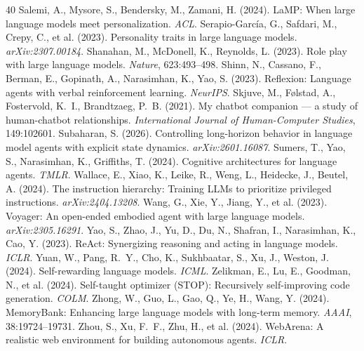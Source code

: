 \documentclass[11pt]{article}
\begin{document}
\begin{thebibliography}{40}
 Salemi, A., Mysore, S., Bendersky, M., Zamani, H. (2024). LaMP: When large language models meet personalization. \emph{ACL}.
 Serapio-Garc\'ia, G., Safdari, M., Crepy, C., et al. (2023). Personality traits in large language models. \emph{arXiv:2307.00184}.
 Shanahan, M., McDonell, K., Reynolds, L. (2023). Role play with large language models. \emph{Nature}, 623:493--498.
 Shinn, N., Cassano, F., Berman, E., Gopinath, A., Narasimhan, K., Yao, S. (2023). Reflexion: Language agents with verbal reinforcement learning. \emph{NeurIPS}.
 Skjuve, M., F\o lstad, A., Fostervold, K.~I., Brandtzaeg, P.~B. (2021). My chatbot companion --- a study of human-chatbot relationships. \emph{International Journal of Human-Computer Studies}, 149:102601.
 Subaharan, S. (2026). Controlling long-horizon behavior in language model agents with explicit state dynamics. \emph{arXiv:2601.16087}.
 Sumers, T., Yao, S., Narasimhan, K., Griffiths, T. (2024). Cognitive architectures for language agents. \emph{TMLR}.
 Wallace, E., Xiao, K., Leike, R., Weng, L., Heidecke, J., Beutel, A. (2024). The instruction hierarchy: Training LLMs to prioritize privileged instructions. \emph{arXiv:2404.13208}.
 Wang, G., Xie, Y., Jiang, Y., et al. (2023). Voyager: An open-ended embodied agent with large language models. \emph{arXiv:2305.16291}.
 Yao, S., Zhao, J., Yu, D., Du, N., Shafran, I., Narasimhan, K., Cao, Y. (2023). ReAct: Synergizing reasoning and acting in language models. \emph{ICLR}.
 Yuan, W., Pang, R.~Y., Cho, K., Sukhbaatar, S., Xu, J., Weston, J. (2024). Self-rewarding language models. \emph{ICML}.
 Zelikman, E., Lu, E., Goodman, N., et al. (2024). Self-taught optimizer (STOP): Recursively self-improving code generation. \emph{COLM}.
 Zhong, W., Guo, L., Gao, Q., Ye, H., Wang, Y. (2024). MemoryBank: Enhancing large language models with long-term memory. \emph{AAAI}, 38:19724--19731.
 Zhou, S., Xu, F.~F., Zhu, H., et al. (2024). WebArena: A realistic web environment for building autonomous agents. \emph{ICLR}.
\end{thebibliography}
\end{document}
